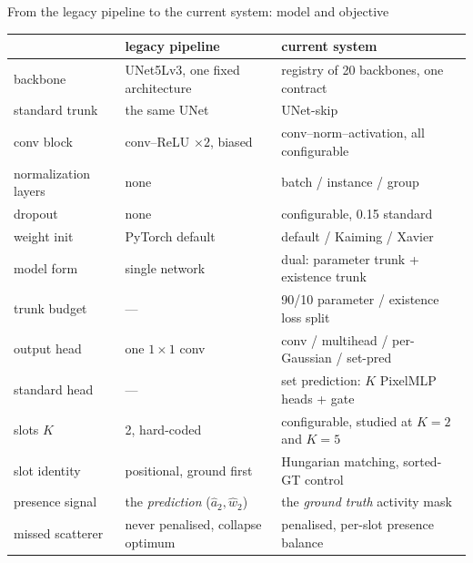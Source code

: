 \begin{frame}{From the legacy pipeline to the current system: model and objective}
  \centering
  \scriptsize
  \renewcommand{\arraystretch}{1.12}
  \begin{tabular}{@{}l p{4.9cm} p{6.1cm}@{}}
    \toprule
    & \textbf{legacy pipeline} & \textbf{current system} \\
    \midrule
    backbone            & UNet5Lv3, one fixed architecture            & registry of 20 backbones, one contract \\
    standard trunk      & the same UNet                               & UNet-skip \\
    conv block          & conv--ReLU $\times 2$, biased               & conv--norm--activation, all configurable \\
    normalization layers& none                                        & batch / instance / group \\
    dropout             & none                                        & configurable, 0.15 standard \\
    weight init         & PyTorch default                             & default / Kaiming / Xavier \\
    \addlinespace[3pt]
    model form          & single network                              & dual: parameter trunk + existence trunk \\
    trunk budget        & \textcolor{soft}{---}                       & 90/10 parameter / existence loss split \\
    output head         & one $1{\times}1$ conv                       & conv / multihead / per-Gaussian / set-pred \\
    standard head       & \textcolor{soft}{---}                       & set prediction: $K$ PixelMLP heads + gate \\
    \addlinespace[3pt]
    slots $K$           & 2, hard-coded                               & configurable, studied at $K{=}2$ and $K{=}5$ \\
    slot identity       & positional, ground first                    & Hungarian matching, sorted-GT control \\
    presence signal     & the \emph{prediction} ($\hat a_2, \hat w_2$)& the \emph{ground truth} activity mask \\
    missed scatterer    & never penalised, collapse optimum           & penalised, per-slot presence balance \\

\end{tabular}
\end{frame}
